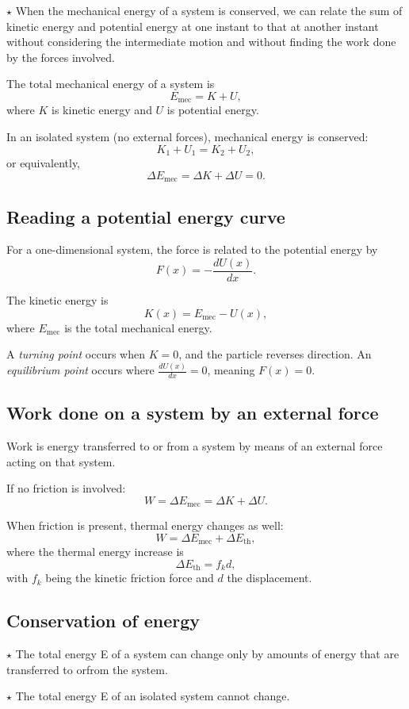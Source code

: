 \noindent $\star$ When the mechanical energy of a system is conserved, we can relate the sum of kinetic energy and potential energy at one instant to that at another instant without considering the intermediate motion and without finding the work done by the forces involved.


The total mechanical energy of a system is
\[
E_{\text{mec}} = K + U,
\]
where \(K\) is kinetic energy and \(U\) is potential energy.

In an isolated system (no external forces), mechanical energy is conserved:
\[
K_1 + U_1 = K_2 + U_2,
\]
or equivalently,
\[
\Delta E_{\text{mec}} = \Delta K + \Delta U = 0.
\]

\subsection{Reading a potential energy curve}
For a one-dimensional system, the force is related to the potential energy by  
\[
F(x) = -\frac{dU(x)}{dx}.
\]

The kinetic energy is  
\[
K(x) = E_{\text{mec}} - U(x),
\]
where \(E_{\text{mec}}\) is the total mechanical energy.

A \textit{turning point} occurs when \(K = 0\), and the particle reverses direction.  
An \textit{equilibrium point} occurs where \(\frac{dU(x)}{dx} = 0\), meaning \(F(x) = 0\).

\subsection{Work done on a system by an external force}
Work is energy transferred to or from a system by means of an external force acting on that system.

If no friction is involved:
\[
W = \Delta E_{\text{mec}} = \Delta K + \Delta U.
\]

When friction is present, thermal energy changes as well:
\[
W = \Delta E_{\text{mec}} + \Delta E_{\text{th}},
\]
where the thermal energy increase is
\[
\Delta E_{\text{th}} = f_k d,
\]
with \(f_k\) being the kinetic friction force and \(d\) the displacement.

\subsection{Conservation of energy}
\noindent $\star$ The total energy E of a system can change only by amounts of energy that are transferred to orfrom the system.

\noindent $\star$ The total energy E of an isolated system cannot change.

